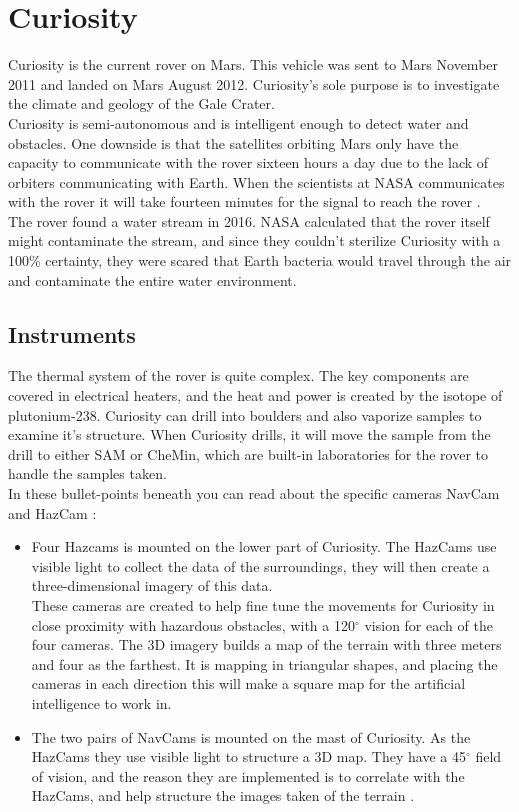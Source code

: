 \section{Curiosity}
\label{ch:existingSolutions_Curiosity}
Curiosity is the current rover on Mars. This vehicle was sent to Mars November 2011 and landed on Mars August 2012. Curiosity's sole purpose is to investigate the climate and geology of the Gale Crater\cite{CuriosityMissions}.\\ Curiosity is semi-autonomous and is intelligent enough to detect water and obstacles. One downside is that the satellites orbiting Mars only have the capacity to communicate with the rover sixteen hours a day due to the lack of orbiters communicating with Earth. When the scientists at NASA communicates with the rover it will take fourteen minutes for the signal to reach the rover\cite{CuriosityCommunication} \cite{CuriosityNASA}.\\
The rover found a water stream in 2016. NASA calculated that the rover itself might contaminate the stream, and since they couldn't sterilize Curiosity with a 100\% certainty, they were scared that Earth bacteria would travel through the air and contaminate the entire water environment\cite{Curiosity2016}.

\subsection{Instruments}
The thermal system of the rover is quite complex. The key components are covered in electrical heaters, and the heat and power is created by the isotope of plutonium-238. Curiosity can drill into boulders and also vaporize samples to examine it's structure. When Curiosity drills, it will move the sample from the drill to either SAM or CheMin, which are built-in laboratories for the rover to handle the samples taken.\\
In these bullet-points beneath you can read about the specific cameras NavCam and HazCam \cite{CuriosityNASA}\cite{CuriosityPOWER}: 

\begin{itemize}
\item Four Hazcams is mounted on the lower part of Curiosity. The HazCams use visible light to collect the data of the surroundings, they will then create a three-dimensional imagery of this data.\\ These cameras are created to help fine tune the movements for Curiosity in close proximity with hazardous obstacles, with a 120${^\circ}$ vision for each of the four cameras. The 3D imagery builds a map of the terrain with three meters and four as the farthest. It is mapping in triangular shapes, and placing the cameras in each direction this will make a square map for the artificial intelligence to work in\cite{CuriosityVision}. 
\item The two pairs of NavCams is mounted on the mast of Curiosity. As the HazCams they use visible light to structure a 3D map. They have a 45${^\circ}$ field of vision, and the reason they are implemented is to correlate with the HazCams, and help structure the images taken of the terrain \cite{CuriosityVision}. 
\end{itemize}

